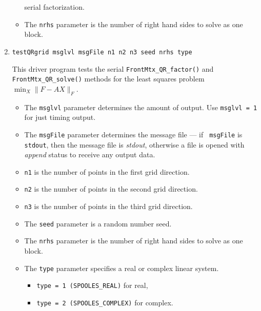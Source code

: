 \begin{enumerate}
\begin{itemize}
serial factorization.
\item
The {\tt nrhs} parameter is the number of right hand sides to solve
as one block.
\end{itemize}
\item
\begin{verbatim}
testQRgrid msglvl msgFile n1 n2 n3 seed nrhs type
\end{verbatim}
This driver program tests the serial {\tt FrontMtx\_QR\_factor()}
and {\tt FrontMtx\_QR\_solve()} methods for the least squares problem
$ \min_X \| F - A X \|_F$.
\par
\begin{itemize}
\item
The {\tt msglvl} parameter determines the amount of output.
Use {\tt msglvl = 1} for just timing output.
\item
The {\tt msgFile} parameter determines the message file --- if {\tt
msgFile} is {\tt stdout}, then the message file is {\it stdout},
otherwise a file is opened with {\it append} status to receive any
output data.
\item
{\tt n1} is the number of points in the first grid direction.
\item
{\tt n2} is the number of points in the second grid direction.
\item
{\tt n3} is the number of points in the third grid direction.
\item
The {\tt seed} parameter is a random number seed.
\item
The {\tt nrhs} parameter is the number of right hand sides to solve
as one block.
\item
The {\tt type} parameter specifies a real or complex linear system.
\begin{itemize}
\item
{\tt type = 1 (SPOOLES\_REAL)} for real,
\item
{\tt type = 2 (SPOOLES\_COMPLEX)} for complex.
\end{itemize}
\end{itemize}
\end{enumerate}

